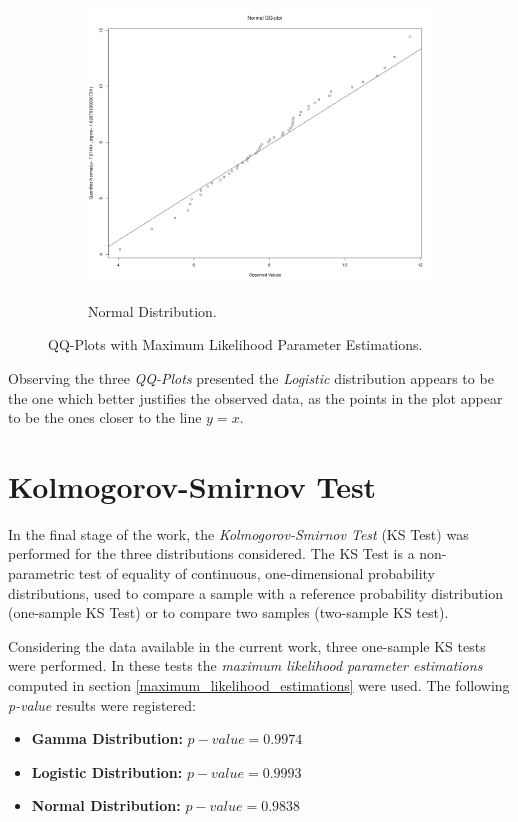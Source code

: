 \documentclass[12pt]{article}
\begin{document}
\begin{figure}[h]
\begin{subfigure}{\linewidth}
		\centering
		\includegraphics[scale=.2]{images/QQPlot_Normal.png}
		\label{qq_plot_normal}
		\caption{Normal Distribution.}
	\end{subfigure}
	\caption{QQ-Plots with Maximum Likelihood Parameter Estimations.}
	\label{qq_plots}
\end{figure}

Observing the three \emph{QQ-Plots} presented the \emph{Logistic} distribution appears to be the one which better justifies the observed data, as the points in the plot appear to be the ones closer to the line $y=x$.

\section{Kolmogorov-Smirnov Test}
\label{ks_test}

In the final stage of the work, the \emph{Kolmogorov-Smirnov Test} (KS Test) was performed for the three distributions considered. The KS Test is a non-parametric test of equality of continuous, one-dimensional probability distributions, used to compare a sample with a reference probability distribution (one-sample KS Test) or to compare two samples (two-sample KS test).

Considering the data available in the current work, three one-sample KS tests were performed. In these tests the \emph{maximum likelihood parameter estimations} computed in section \ref{maximum_likelihood_estimations} were used. The following \emph{p-value} results were registered:

\begin{itemize}
	\item \textbf{Gamma Distribution:} $p-value=0.9974$
	
	\item \textbf{Logistic Distribution:} $p-value=0.9993$
	
	\item \textbf{Normal Distribution:} $p-value=0.9838$
\end{itemize}
\end{document}
